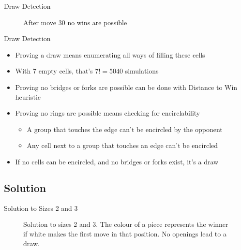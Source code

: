 \documentclass{beamer} %
\begin{document}


\begin{frame}{Draw Detection}
\begin{figure}
	\centering
	\begin{HavannahBoard}[board size=4,coordinate style=classical,show coordinates=false]
	\end{HavannahBoard}
	\caption{After move 30 no wins are possible}
\end{figure}
\end{frame}

\begin{frame}{Draw Detection}
\begin{itemize}
\item Proving a draw means enumerating all ways of filling these cells
\item With 7 empty cells, that's $7! = 5040$ simulations
\item Proving no bridges or forks are possible can be done with Distance to Win heuristic
\item Proving no rings are possible means checking for encirclability
	\begin{itemize}
	\item A group that touches the edge can't be encircled by the opponent
	\item Any cell next to a group that touches an edge can't be encircled
	\end{itemize}
\item If no cells can be encircled, and no bridges or forks exist, it's a draw
\end{itemize}
\end{frame}


\subsection{Solution}

\begin{frame}{Solution to Sizes 2 and 3}
\begin{figure}[tb]
\centering
	\begin{HavannahBoard}[board size=2,coordinate style=classical,show coordinates=false]
	\end{HavannahBoard}
	\begin{HavannahBoard}[board size=3,coordinate style=classical,show coordinates=false]
	\end{HavannahBoard}
\caption{Solution to sizes 2 and 3. The colour of a piece represents the winner if white makes the first move in that position. No openings lead to a draw.}
\end{figure}
\end{frame}
\end{document}
